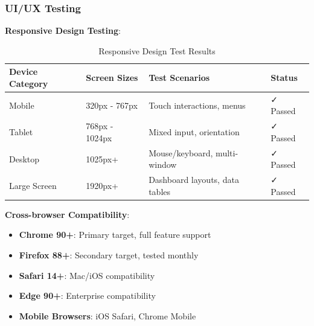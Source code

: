 \documentclass[12pt,a4paper]{article}
\begin{document}
\subsubsection{UI/UX Testing}
\textbf{Responsive Design Testing}:
\begin{table}[H]
\centering
\begin{tabular}{@{}llll@{}}
\toprule
\textbf{Device Category} & \textbf{Screen Sizes} & \textbf{Test Scenarios} & \textbf{Status} \\
\midrule
Mobile & 320px - 767px & Touch interactions, menus & ✓ Passed \\
Tablet & 768px - 1024px & Mixed input, orientation & ✓ Passed \\
Desktop & 1025px+ & Mouse/keyboard, multi-window & ✓ Passed \\
Large Screen & 1920px+ & Dashboard layouts, data tables & ✓ Passed \\
\bottomrule
\end{tabular}
\caption{Responsive Design Test Results}
\end{table}

\textbf{Cross-browser Compatibility}:
\begin{itemize}
    \item \textbf{Chrome 90+}: Primary target, full feature support
    \item \textbf{Firefox 88+}: Secondary target, tested monthly
    \item \textbf{Safari 14+}: Mac/iOS compatibility
    \item \textbf{Edge 90+}: Enterprise compatibility
    \item \textbf{Mobile Browsers}: iOS Safari, Chrome Mobile
\end{itemize}
\end{document}
